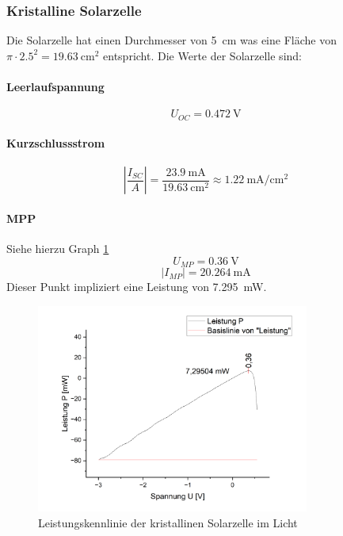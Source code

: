 \documentclass[12pt,a4paper,ngerman]{report}
\begin{document}
		
		\subsubsection{Kristalline Solarzelle}
		Die Solarzelle hat einen Durchmesser von \qty{5}{\centi\m} was eine Fläche von $\pi\cdot\num{2,5}^2=\qty{19,63}{\centi\m^2}$ entspricht. Die Werte der Solarzelle sind:
		
		\paragraph{Leerlaufspannung}
		\[	U_{OC} = \qty{0,472}{\volt} \]
		
		\paragraph{Kurzschlussstrom}
		$$\left|\frac{I_{SC}}{A}\right|=\frac{\qty{23,9}{\milli\ampere}}{\qty{19.63}{\centi\square\metre}}\approx\qty{1.22}{\milli\ampere\per\centi\square\metre} $$
		
		\paragraph{MPP} Siehe hierzu Graph \ref{fig:Leistkrishell}
		$$U_{MP}=\qty{0,36}{\volt}$$ $$\vert I_{MP}\vert=\qty{20,264}{\milli\ampere}$$ 
		Dieser Punkt impliziert eine Leistung von \qty{7,295}{\milli\watt}.

		\begin{figure}
			\centering
			\includegraphics[width=0.8\textwidth]{Origin/LeistungKristall.png}
			\caption{Leistungskennlinie der kristallinen Solarzelle im Licht}
			\label{fig:Leistkrishell}
		\end{figure}
		
\end{document}
